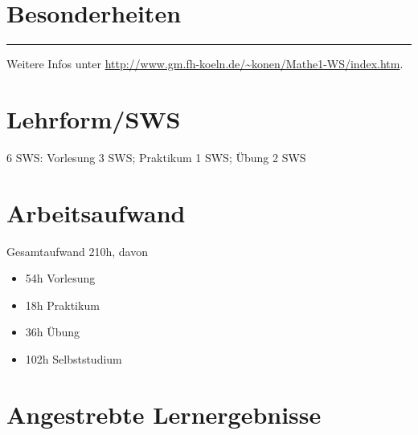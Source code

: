\hypertarget{besonderheitenpathlabel....srcmodulbeschreibungen-bachelor-bpo5ba_mathematik1}{%
\section*{Besonderheiten\label{../../src/modulbeschreibungen-bachelor-bpo5/BA_Mathematik1}}\label{besonderheitenpathlabel....srcmodulbeschreibungen-bachelor-bpo5ba_mathematik1}}

\begin{center}\rule{0.5\linewidth}{0.5pt}\end{center}

Weitere Infos unter
\url{http://www.gm.fh-koeln.de/~konen/Mathe1-WS/index.htm}.

\hypertarget{lehrformswspathlabel....srcmodulbeschreibungen-bachelor-bpo5ba_mathematik1}{%
\section*{Lehrform/SWS\label{../../src/modulbeschreibungen-bachelor-bpo5/BA_Mathematik1}}\label{lehrformswspathlabel....srcmodulbeschreibungen-bachelor-bpo5ba_mathematik1}}

6 SWS: Vorlesung 3 SWS; Praktikum 1 SWS; Übung 2 SWS

\hypertarget{arbeitsaufwandpathlabel....srcmodulbeschreibungen-bachelor-bpo5ba_mathematik1}{%
\section*{Arbeitsaufwand\label{../../src/modulbeschreibungen-bachelor-bpo5/BA_Mathematik1}}\label{arbeitsaufwandpathlabel....srcmodulbeschreibungen-bachelor-bpo5ba_mathematik1}}

Gesamtaufwand 210h, davon

\begin{itemize}
\tightlist
\item
  54h Vorlesung
\item
  18h Praktikum
\item
  36h Übung
\item
  102h Selbststudium
\end{itemize}

\hypertarget{angestrebte-lernergebnissepathlabel....srcmodulbeschreibungen-bachelor-bpo5ba_mathematik1}{%
\section*{Angestrebte
Lernergebnisse\label{../../src/modulbeschreibungen-bachelor-bpo5/BA_Mathematik1}}\label{angestrebte-lernergebnissepathlabel....srcmodulbeschreibungen-bachelor-bpo5ba_mathematik1}}

